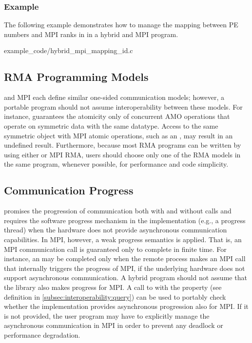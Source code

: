 \subsubsection*{Example}
\label{subsubsec:interoperability:id:example}
The following example demonstrates how to manage the mapping between \openshmem
PE numbers and MPI ranks in  in a hybrid \openshmem
and MPI program.


      {example_code/hybrid_mpi_mapping_id.c}

\subsection{RMA Programming Models}
\label{subsec:interoperability:rma}

\openshmem and MPI each define similar one-sided communication models;
however, a portable program should not assume interoperability between these
models.
For instance, \openshmem guarantees the atomicity only of concurrent \openshmem AMO operations
that operate on symmetric data with the same datatype. Access to the same symmetric
object with MPI atomic operations, such as an , may
result in an undefined result. Furthermore,
because most RMA programs can be written by using either \openshmem or MPI RMA,
users should choose only one of the RMA models in the same program, whenever
possible, for performance and code simplicity.

\subsection{Communication Progress}
\label{subsec:interoperability:progress}

\openshmem promises the progression of communication both with and without
\openshmem calls and requires the software progress mechanism in the implementation
(e.g., a progress thread) when the hardware does not provide asynchronous communication
capabilities. In MPI, however, a weak progress semantics is applied. That is,
an MPI communication call is guaranteed only to complete in finite time. For
instance, an  may be completed only when the remote process makes an MPI
call that internally triggers the progress of MPI, if the underlying hardware
does not support asynchronous communication. A hybrid program
should not assume that the \openshmem library also makes progress for MPI.
A call to  with the 
property (see definition in \ref{subsec:interoperability:query})
can be used to portably check whether the implementation provides asynchronous
progression also for MPI. If it is not provided, the user program may have to
explicitly manage the asynchronous communication in MPI in
order to prevent any deadlock or performance degradation.


